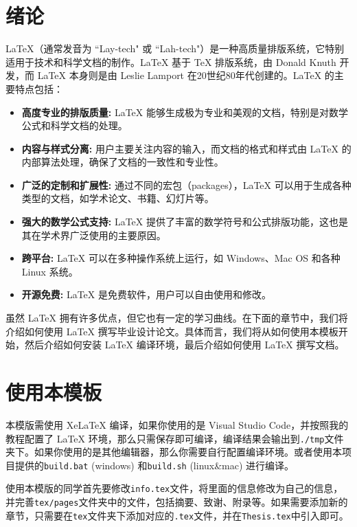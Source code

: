 \section{绪论}\label{sec:introduction}

LaTeX（通常发音为 ``Lay-tech" 或 ``Lah-tech"）是一种高质量排版系统，它特别适用于技术和科学文档的制作。LaTeX 基于 TeX 排版系统，由 Donald Knuth 开发，而 LaTeX 本身则是由 Leslie Lamport 在20世纪80年代创建的。LaTeX 的主要特点包括：

\begin{itemize}
    \item \textbf{高度专业的排版质量:} LaTeX 能够生成极为专业和美观的文档，特别是对数学公式和科学文档的处理。
    \item \textbf{内容与样式分离:} 用户主要关注内容的输入，而文档的格式和样式由 LaTeX 的内部算法处理，确保了文档的一致性和专业性。
    \item \textbf{广泛的定制和扩展性:} 通过不同的宏包（packages），LaTeX 可以用于生成各种类型的文档，如学术论文、书籍、幻灯片等。
    \item \textbf{强大的数学公式支持:} LaTeX 提供了丰富的数学符号和公式排版功能，这也是其在学术界广泛使用的主要原因。
    \item \textbf{跨平台:} LaTeX 可以在多种操作系统上运行，如 Windows、Mac OS 和各种 Linux 系统。
    \item \textbf{开源免费:} LaTeX 是免费软件，用户可以自由使用和修改。
\end{itemize}

虽然 LaTeX 拥有许多优点，但它也有一定的学习曲线。在下面的章节中，我们将介绍如何使用 LaTeX 撰写毕业设计论文。具体而言，我们将从如何使用本模板开始，然后介绍如何安装 LaTeX 编译环境，最后介绍如何使用 LaTeX 撰写文档。

\section{使用本模板}

本模版需使用 XeLaTeX 编译，如果你使用的是 Visual Studio Code，并按照我的教程配置了 LaTeX 环境，那么只需保存即可编译，编译结果会输出到\texttt{./tmp}文件夹下。如果你使用的是其他编辑器，那么你需要自行配置编译环境。或者使用本项目提供的\texttt{build.bat} (windows) 和\texttt{build.sh} (linux\&mac) 进行编译。

使用本模版的同学首先要修改\texttt{info.tex}文件，将里面的信息修改为自己的信息，并完善\texttt{tex/pages}文件夹中的文件，包括摘要、致谢、附录等。如果需要添加新的章节，只需要在\texttt{tex}文件夹下添加对应的\texttt{.tex}文件，并在\texttt{Thesis.tex}中引入即可。

